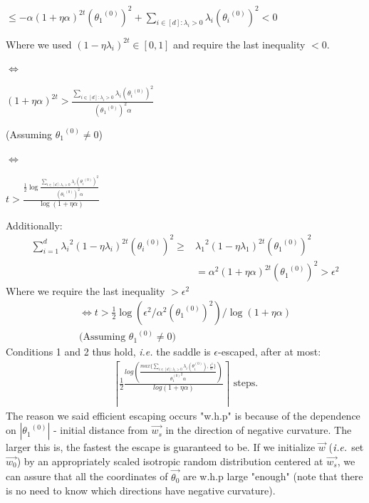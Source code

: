 \documentclass[12pt]{article}
\newcommand{\ceil}[1]{\left\lceil #1 \right\rceil}
\newcommand{\ie}{{\it i.e. }}
\begin{document}
    $ \leq {-\alpha}{(1 + \eta\alpha)}^{2t}{({\theta_1}^{(0)})}^{2} + {\sum_{i\in[d]: {\lambda_i > 0}} {\lambda_i}{({\theta_i}^{(0)})}^{2}} < 0 $ 
    
    Where we used ${{(1 - \eta\lambda_i)}^{2t} \in [0,1]}$  and require the last inequality $< 0$.
    
    $\Longleftrightarrow$
    
    ${(1 + \eta\alpha)}^{2t} > {\frac{\sum_{i\in[d]: {\lambda_i > 0}} {\lambda_i}{({\theta_i}^{(0)})}^{2}}{({\theta_1}^{(0)})^2\alpha}}$
    
    (Assuming ${\theta_1}^{(0)} \ne 0$)
    
    $\Longleftrightarrow$
    
    $t > \frac{\frac{1}{2}\log {\frac{\sum_{i\in[d]: {\lambda_i > 0}} {\lambda_i}{({\theta_i}^{(0)})}^{2}}{({\theta_1}^{(0)})^{2}\alpha}}}{\log {(1+\eta\alpha)}}$
    
	\newpage
	Additionally:
	\begin{align*}
	{\sum_{i=1}^{d} {{\lambda_i}^{2}}{(1 - \eta\lambda_i)}^{2t}{({\theta_i}^{(0)})}^{2}} \geq & {{\lambda_1}^{2}}{(1 - \eta\lambda_1)}^{2t}{({\theta_1}^{(0)})}^{2} \\
	& = {{\alpha}^{2}}{(1 + \eta\alpha)}^{2t}{({\theta_1}^{(0)})}^{2} > {{\epsilon} ^{2}}
	\end{align*}
	Where we require the last inequality $>\epsilon^{2}$
	\begin{align*}
	    \Longleftrightarrow
    	t > {\frac{1}{2}\log {({{\epsilon}^{2}} / { \alpha^2 ({\theta_1}^{(0)})^{2}})}} / {\log {(1+\eta\alpha)}} \\
    	\text{(Assuming ${\theta_1}^{(0)} \ne 0$)}
	\end{align*}
	Conditions 1 and 2 thus hold, \ie the saddle is $\epsilon$-escaped, after at most:
	\begin{align*}
	    \ceil{\frac{1}{2} \frac{log\left(\frac{max\{\sum_{i\in[d]: {\lambda_i > 0}} {\lambda_i (\theta_i^{(0)})}, \frac{\epsilon^2}{\alpha} \}}{{{\theta_1^{(0)}}^2}\alpha}\right)}{log(1+\eta\alpha)}} \text{ steps.}
	\end{align*}
	The reason we said efficient escaping occurs "w.h.p" is because of the dependence on $|{\theta_1}^{(0)}|$ - initial distance from $\overrightarrow{w_s}$ in the direction of negative curvature. The larger this is, the fastest the escape is guaranteed to be. If we initialize $\overrightarrow{w}$ ($\ie$  set $\overrightarrow{w_0}$) by an appropriately scaled isotropic random distribution centered at $\overrightarrow{w_s}$, we can assure that all the coordinates of $\overrightarrow{\theta_0}$ are w.h.p large "enough" (note that there is no need to know which directions have negative curvature).
\end{document}
